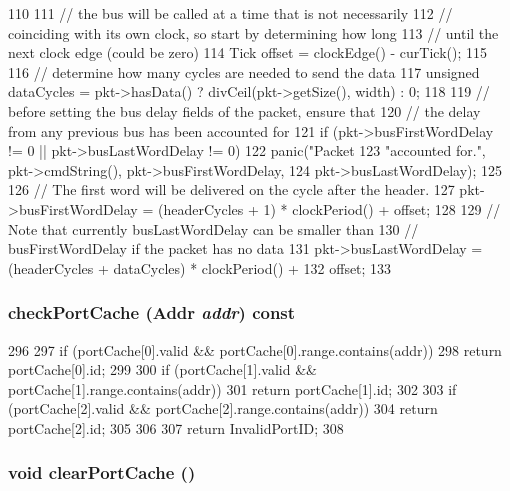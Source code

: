 \begin{DoxyCode}
110 {
111     // the bus will be called at a time that is not necessarily
112     // coinciding with its own clock, so start by determining how long
113     // until the next clock edge (could be zero)
114     Tick offset = clockEdge() - curTick();
115 
116     // determine how many cycles are needed to send the data
117     unsigned dataCycles = pkt->hasData() ? divCeil(pkt->getSize(), width) : 0;
118 
119     // before setting the bus delay fields of the packet, ensure that
120     // the delay from any previous bus has been accounted for
121     if (pkt->busFirstWordDelay != 0 || pkt->busLastWordDelay != 0)
122         panic("Packet %
123               "accounted for.\n", pkt->cmdString(), pkt->busFirstWordDelay,
124               pkt->busLastWordDelay);
125 
126     // The first word will be delivered on the cycle after the header.
127     pkt->busFirstWordDelay = (headerCycles + 1) * clockPeriod() + offset;
128 
129     // Note that currently busLastWordDelay can be smaller than
130     // busFirstWordDelay if the packet has no data
131     pkt->busLastWordDelay = (headerCycles + dataCycles) * clockPeriod() +
132         offset;
133 }
\end{DoxyCode}
\hypertarget{classBaseBus_a3ec7557ff2dd8a9390bbf310b3352ce2}{
\subsubsection[{checkPortCache}]{ checkPortCache ({\bf Addr} {\em addr}) const}}
\label{classBaseBus_a3ec7557ff2dd8a9390bbf310b3352ce2}



\begin{DoxyCode}
296                                                   {
297         if (portCache[0].valid && portCache[0].range.contains(addr)) {
298             return portCache[0].id;
299         }
300         if (portCache[1].valid && portCache[1].range.contains(addr)) {
301             return portCache[1].id;
302         }
303         if (portCache[2].valid && portCache[2].range.contains(addr)) {
304             return portCache[2].id;
305         }
306 
307         return InvalidPortID;
308     }
\end{DoxyCode}
\hypertarget{classBaseBus_a2b259c34a080563d0e03d5a1fec2cd7a}{
\subsubsection[{clearPortCache}]{\setlength{\rightskip}{0pt plus 5cm}void clearPortCache ()}}
\label{classBaseBus_a2b259c34a080563d0e03d5a1fec2cd7a}



